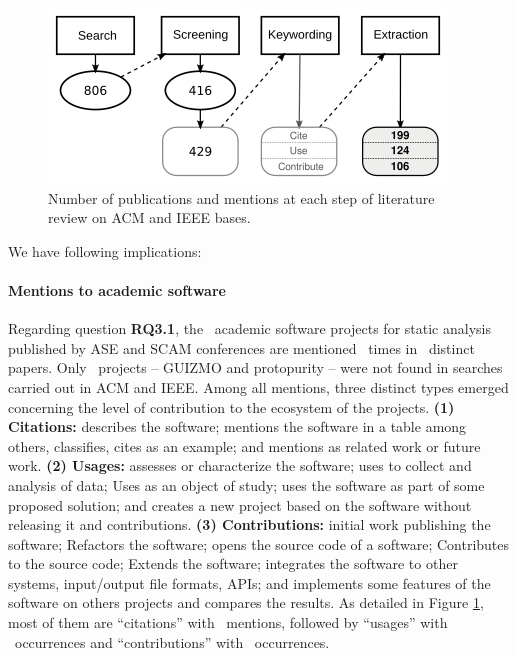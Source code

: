 \begin{figure}[ht]
  \center
  \includegraphics[scale=0.25]{figs/study2-literature-review.png}
  \caption{Number of publications and mentions at each step of literature review on ACM and IEEE bases.}
  \label{study2-literature-review}
\end{figure}

%
We have following implications:

\paragraph{\bf Mentions to academic software}
Regarding question \textbf{RQ3.1},
the \SoftwareCount \ academic software
projects for static analysis published by ASE and SCAM conferences are
mentioned \ScreeningCount \ times in \ScreeningUniqueCount \ distinct papers.
Only \SoftwareNotFoundOnSearch \ projects --
GUIZMO and protopurity -- were not found in
searches carried out in ACM and IEEE.
%
Among all mentions, three distinct types emerged concerning the level of
contribution to the ecosystem of the projects.
%
\textbf{(1) Citations:}
  describes the software;
  mentions the software in a table among others, classifies, cites as an example;
  and mentions as related work or future work.
%
\textbf{(2) Usages:}
  assesses or characterize the software;
  uses to collect and analysis of data; Uses as an object of study;
  uses the software as part of some proposed solution;
  and creates a new project based on the software without releasing it and contributions.
%
\textbf{(3) Contributions:}
  initial work publishing the software; Refactors the software;
  opens the source code of a software; Contributes to the source code; Extends the software;
  integrates the software to other systems, input/output file formats, APIs;
  and implements some features of the software on others projects and compares the results.
%
As detailed in Figure \ref{study2-literature-review}, most of them are ``citations''
 with \CiteCount \ mentions, followed by ``usages'' with \UseCount \ occurrences and ``contributions'' with \ContributeCount \ occurrences.

